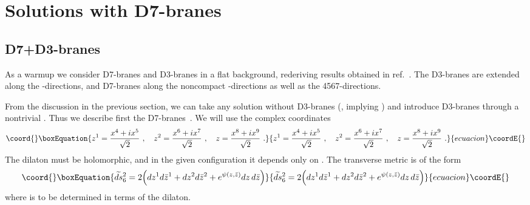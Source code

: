 \documentclass[a4paper,12pt]{article}
\renewcommand{\=}[1]{\bar{#1}}
\providecommand{\sect}[1]{\section{#1}\setcounter{equation}{0}}
\begin{document}
\sect{Solutions with D7-branes}

\subsection{D7+D3-branes}

As a warmup we consider D7-branes and D3-branes in a flat background, rederiving
results obtained in ref.~\cite{Aharonyetal}.  The D3-branes are extended
along the
\myHighlight{$\mu$}\coordHE{}-directions, and D7-branes along the noncompact \myHighlight{$\mu$}\coordHE{}-directions as well
as the 4567-directions.

From the discussion in the previous section, we can take any solution without
D3-branes (\coordHE{}, implying \coordHE{}) and introduce D3-branes through a
nontrivial
\coordHE{}.  Thus we describe first the D7-branes~\cite{stringycstrings}.  We will
use the complex coordinates
\begin{equation}\coord{}\boxEquation{
z^1=\frac{x^4+ix^5}{\sqrt2}\ ,\quad
z^2=\frac{x^6+ix^7}{\sqrt2}\ ,
\quad z=\frac{x^8+ix^9}{\sqrt2}\ .
\label{zdef}
}{
z^1=\frac{x^4+ix^5}{\sqrt2}\ ,\quad
z^2=\frac{x^6+ix^7}{\sqrt2}\ ,
\quad z=\frac{x^8+ix^9}{\sqrt2}\ .
}{ecuacion}\coordE{}\end{equation}
The dilaton \myHighlight{$\tau$}\coordHE{} must be holomorphic, and in the given configuration it
depends
only on \coordHE{}.
The transverse metric is of the form
\begin{equation}\coord{}\boxEquation{
\widetilde{ds}{}_6^{2}=2\Bigl(
dz^{1}d\bar{z}^{1}+ dz^{2}d\bar{z}^{2}+ e^{\psi(z,\bar{z})}
dz \,d\bar{z} \Bigr)
\label{metric}
}{
\widetilde{ds}{}_6^{2}=2\Bigl(
dz^{1}d\bar{z}^{1}+ dz^{2}d\bar{z}^{2}+ e^{\psi(z,\bar{z})}
dz \,d\bar{z} \Bigr)
}{ecuacion}\coordE{}\end{equation}
where \myHighlight{$\psi$}\coordHE{} is to be determined in terms of the dilaton.
\end{document}
